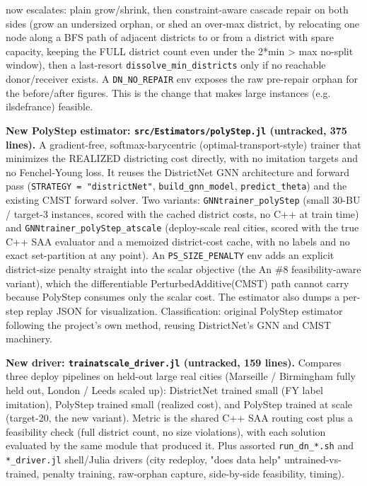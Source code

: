 \documentclass[10pt]{article}
\begin{document}
  now escalates: plain grow/shrink, then constraint-aware cascade repair on both sides (grow an undersized orphan, or
  shed an over-max district, by relocating one node along a BFS path of adjacent districts to or from a district with
  spare capacity, keeping the FULL district count even under the 2*min > max no-split window), then a last-resort
  \texttt{dissolve\_min\_districts} only if no reachable donor/receiver exists. A \texttt{DN\_NO\_REPAIR} env exposes the raw pre-repair
  orphan for the before/after figures. This is the change that makes large instances (e.g. ilsdefrance) feasible.

\textbf{New PolyStep estimator: \texttt{src/Estimators/polyStep.jl} (untracked, 375 lines).} A gradient-free,
softmax-barycentric (optimal-transport-style) trainer that minimizes the REALIZED districting cost directly, with no
imitation targets and no Fenchel-Young loss. It reuses the DistrictNet GNN architecture and forward pass
(\texttt{STRATEGY = "districtNet"}, \texttt{build\_gnn\_model}, \texttt{predict\_theta}) and the existing CMST forward solver. Two variants:
\texttt{GNNtrainer\_polyStep} (small 30-BU / target-3 instances, scored with the cached district costs, no C++ at train time)
and \texttt{GNNtrainer\_polyStep\_atscale} (deploy-scale real cities, scored with the true C++ SAA evaluator and a memoized
district-cost cache, with no labels and no exact set-partition at any point). An \texttt{PS\_SIZE\_PENALTY} env adds an explicit
district-size penalty straight into the scalar objective (the An \#8 feasibility-aware variant), which the
differentiable PerturbedAdditive(CMST) path cannot carry because PolyStep consumes only the scalar cost. The estimator
also dumps a per-step replay JSON for visualization. Classification: original PolyStep estimator following the
project's own method, reusing DistrictNet's GNN and CMST machinery.

\textbf{New driver: \texttt{trainatscale\_driver.jl} (untracked, 159 lines).} Compares three deploy pipelines on held-out large
real cities (Marseille / Birmingham fully held out, London / Leeds scaled up): DistrictNet trained small (FY label
imitation), PolyStep trained small (realized cost), and PolyStep trained at scale (target-20, the new variant). Metric
is the shared C++ SAA routing cost plus a feasibility check (full district count, no size violations), with each
solution evaluated by the same module that produced it. Plus assorted \texttt{run\_dn\_*.sh} and \texttt{*\_driver.jl} shell/Julia
drivers (city redeploy, "does data help" untrained-vs-trained, penalty training, raw-orphan capture, side-by-side
feasibility, timing).
\end{document}

